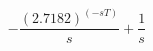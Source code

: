 \documentclass[12pt]{article}
\begin{document}
\begin{displaymath}
-\frac{{(2.7182)}^{{(- s T)}}}{s}+\frac{1}{s}
\end{displaymath}
\end{document}
